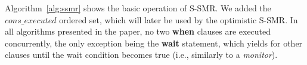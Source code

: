 %


Algorithm~\ref{alg:ssmr} shows the basic operation of S-SMR. 
We added the $cons\_executed$ ordered set, which will later be used by the optimistic S-SMR.
In all algorithms presented in the paper, no two \textbf{when} clauses are executed concurrently, the only exception being the \textbf{wait} statement, which yields for other clauses until the wait condition becomes true (i.e., similarly to a \emph{monitor}).

%

